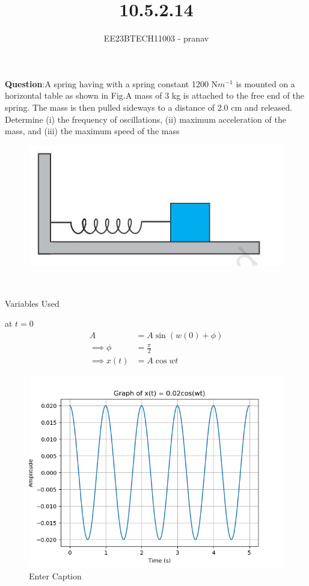 \documentclass[journal,12pt,twocolumn]{IEEEtran}
\theoremstyle{remark}
\begin{document}

\vspace{3cm}

\title{10.5.2.14}
\author{EE23BTECH11003 - pranav}
\maketitle
\newpage

\bigskip
\renewcommand{\thefigure}{\arabic{figure}}
\renewcommand{\thetable}{\arabic{table}}

\textbf{Question}:A spring having with a spring constant 1200 N$m^{-1}$ is mounted on a horizontal
table as shown in Fig.A mass of 3 kg is attached to the free end of the
spring. The mass is then pulled sideways to a distance of 2.0 cm and released.\\
Determine (i) the frequency of oscillations, (ii) maximum acceleration of the mass,
and (iii) the maximum speed of the mass
\begin{figure}[h!]
    \centering
    \includegraphics[width=0.5\linewidth]{figs/figure.jpg}
    \caption{ }
    
\end{figure}\\
\solution
\begin{table}[h]
    \centering
    
    \caption{Variables Used}
    \label{tab:table_11.9.3.6}
\end{table}
at $t=0$
\begin{align}
A&=A\sin{(w(0)+\phi)}\\
\implies \phi&=\frac{\pi}{2}\\
\implies x(t)&=A\cos{wt} 
\end{align}
\begin{figure}[h!]
    \centering
    \includegraphics[width=1.1\linewidth]{figs/analog1.png}
    \caption{Enter Caption}
    \label{fig:enter-label}
\end{figure}\\
\end{document}
